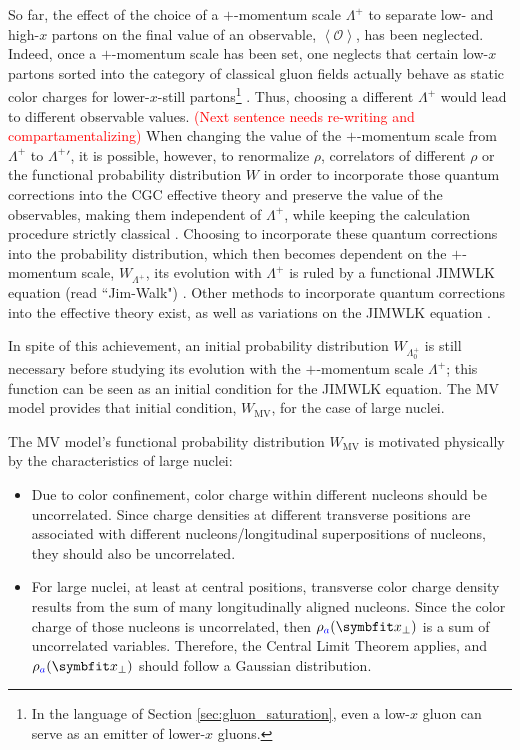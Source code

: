 So far, the effect of the choice of a $+$-momentum scale $\Lambda^+$ to separate low- and high-$x$ partons on the final value of an observable, $\left< \mathcal{O} \right>$, has been neglected. Indeed, once a $+$-momentum scale has been set, one neglects that certain low-$x$ partons sorted into the category of classical gluon fields actually behave as static color charges for lower-$x$-still partons\footnote{In the language of Section \ref{sec:gluon_saturation}, even a low-$x$ gluon can serve as an emitter of lower-$x$ gluons.} \cite{Albacete:2014fwa}. Thus, choosing a different $\Lambda^+$ would lead to different observable values. \textcolor{red}{(Next sentence needs re-writing and compartamentalizing)} When changing the value of the $+$-momentum scale from $\Lambda^+$ to ${\Lambda^+}'$, it is possible, however, to renormalize $\rho$, correlators of different $\rho$ or the functional probability distribution  $W$ in order to incorporate those quantum corrections into the \gls{CGC} effective theory and preserve the value of the observables, making them independent of $\Lambda^+$, while keeping the calculation procedure strictly classical \cite{Albacete:2014fwa}. Choosing to incorporate these quantum corrections into the probability distribution, which then becomes dependent on the $+$-momentum scale, $W_{\Lambda^+}$, its evolution with $\Lambda^+$ is ruled by a functional \gls{JIMWLK} equation (read ``Jim-Walk") \cite{Gelis:2010nm}. Other methods to incorporate quantum corrections into the effective theory exist, as well as variations on the \gls{JIMWLK} equation \cite{Albacete:2014fwa}.

In spite of this achievement, an initial probability distribution $W_{\Lambda^+_0}$ is still necessary before studying its evolution with the $+$-momentum scale $\Lambda^+$; this function can be seen as an initial condition for the \gls{JIMWLK} equation. The \gls{MV} model provides that initial condition, $W_{\text{MV}}$, for the case of large nuclei.

The \gls{MV} model's functional probability distribution $W_{\text{MV}}$ %
is motivated physically by the characteristics of large nuclei: \cite{Gelis_Habilitation}
\begin{itemize}
	\item[1)] Due to color confinement, color charge within different nucleons should be uncorrelated. Since charge densities at different transverse positions are associated with different nucleons/longitudinal superpositions of nucleons, they should also be uncorrelated.
	\item[2)] For large nuclei, at least at central positions, transverse color charge density results from the sum of many longitudinally aligned nucleons. Since the color charge of those nucleons is uncorrelated, then $\rho_\text{\textcolor{blue}{$a$}}(\mathbf{x}_\perp)$ is a sum of uncorrelated variables. Therefore, the Central Limit Theorem applies, and $\rho_\text{\textcolor{blue}{$a$}}(\mathbf{x}_\perp)$ should follow a Gaussian distribution.
\end{itemize}

